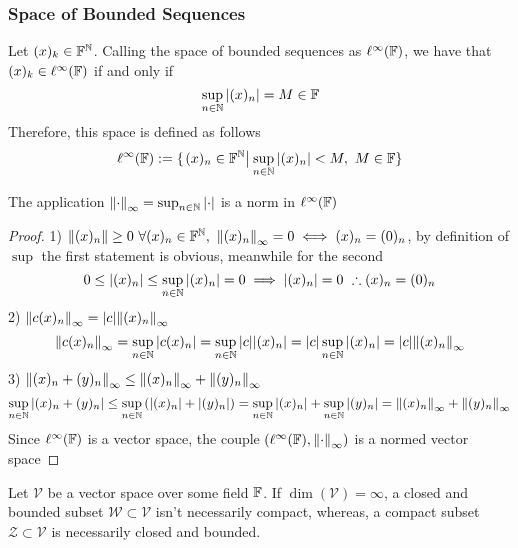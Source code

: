 \documentclass[../complete.tex]{subfiles}
\begin{document}
\subsubsection{Space of Bounded Sequences}
\begin{dfn}
	Let $(x)_k\in\mathbb{F}^{\mathbb{N}}$. Calling the space of bounded sequences as $\ell^\infty(\mathbb{F})$, we have that $(x)_k\in\ell^\infty(\mathbb{F})$ if and only if
	\begin{equation}
		\sup_{n\in\mathbb{N}}\abs{(x)_n}=M\in\mathbb{F}
		\label{eq:boundedseq}
	\end{equation}
	Therefore, this space is defined as follows
	\begin{equation}
		\ell^\infty(\F):=\{\derin{(x)_n\in\F^\N}\sup_{n\in\N}\abs{(x)_n}<M,\ M\in\F\}
		\label{eq:ellinf}
	\end{equation}
\end{dfn}
\begin{thm}
	The application $\norm{\cdot}_{\infty}=\sup_{n\in\mathbb{N}}\abs{\cdot}$ is a norm in $\ell^\infty(\mathbb{F})$
\end{thm}
\begin{proof}
	1) $\norm{(x)_n}\ge0\ \forall(x)_n\in\F^\N,\ \norm{(x)_n}_{\infty}=0\iff(x)_n=(0)_n$, by definition of $\sup$ the first statement is obvious, meanwhile for the second
	\begin{equation*}
		0\le\abs{(x)_n}\le\sup_{n\in\N}\abs{(x)_n}=0\implies\abs{(x)_n}=0\ \therefore(x)_n=(0)_n
	\end{equation*}
	2) $\norm{c(x)_n}_{\infty}=\abs{c}\norm{(x)_n}_{\infty}$
	\begin{equation*}
		\norm{c(x)_n}_{\infty}=\sup_{n\in\mathbb{N}}\abs{c(x)_n}=\sup_{n\in\mathbb{N}}\abs{c}\abs{(x)_n}=\abs{c}\sup_{n\in\mathbb{N}}\abs{(x)_n}=\abs{c}\norm{(x)_n}_{\infty}
	\end{equation*}
	3) $\norm{(x)_n+(y)_n}_{\infty}\le\norm{(x)_n}_\infty+\norm{(y)_n}_\infty$
	\begin{equation*}
		\sup_{n\in\mathbb{N}}\abs{(x)_n+(y)_n}\le\sup_{n\in\mathbb{N}}\left( \abs{(x)_n}+\abs{(y)_n} \right)=\sup_{n\in\mathbb{N}}\abs{(x)_n}+\sup_{n\in\mathbb{N}}\abs{(y)_n}=\norm{(x)_n}_\infty+\norm{(y)_n}_\infty
	\end{equation*}
	Since $\ell^\infty(\mathbb{F})$ is a vector space, the couple $(\ell^\infty(\mathbb{F}),\norm{\cdot}_{\infty})$ is a normed vector space
\end{proof}
\begin{rmk}
	Let $\mathcal{V}$ be a vector space over some field $\mathbb{F}$. If $\dim(\mathcal{V})=\infty$, a closed and bounded subset $\mathcal{W}\subset\mathcal{V}$ isn't necessarily compact, whereas, a compact subset $\mathcal{Z}\subset\mathcal{V}$ is necessarily closed and bounded.
\end{rmk}
\end{document}
